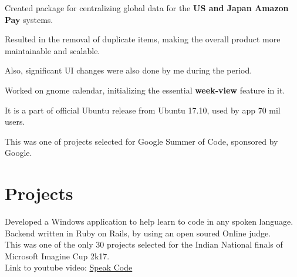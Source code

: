 \documentclass[a4paper]{deedy-resume} %
\begin{document}
\begin{minipage}[t]{0.66\textwidth}
\begin{tightitemize}
\item Created package for centralizing global data for the \textbf{US and Japan Amazon Pay} systems.
\item Resulted in the removal of duplicate items, making the overall product more maintainable and scalable.
\item Also, significant UI changes were also done by me during the period.
\end{tightitemize}

\sectionspace %



\begin{tightitemize}
\item Worked on gnome calendar, initializing the essential \textbf{week-view} feature in it.
\item It is a part of official Ubuntu release from Ubuntu 17.10, used by app 70 mil users.
\item This was one of projects selected for Google Summer of Code, sponsored by Google.
\end{tightitemize}

\sectionspace %


\section{Projects}


Developed a Windows application to help learn to code in any spoken language. \\
Backend written in Ruby on Rails, by using an open soured Online judge. \\
This was one of the only 30 projects selected for the Indian National finals of Microsoft Imagine Cup 2k17. \\
Link to youtube video: \href{https://www.youtube.com/watch?v=hO4iSh1bSC0}{Speak Code}


\end{minipage}
\end{document}
